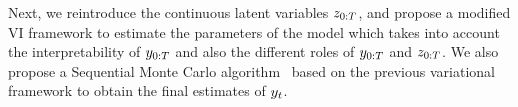 Next, we reintroduce the continuous latent variables $z_{0:T}$, and propose
a modified VI framework to estimate the parameters of the model
which takes into account the interpretability of $y_{0:T}$ and also 
the different roles of $y_{0:T}$ and $z_{0:T}$. 
We also propose a Sequential Monte Carlo algorithm~\citep{doucet2009tutorial} 
based on the previous variational framework to obtain the final estimates of $y_t$.
